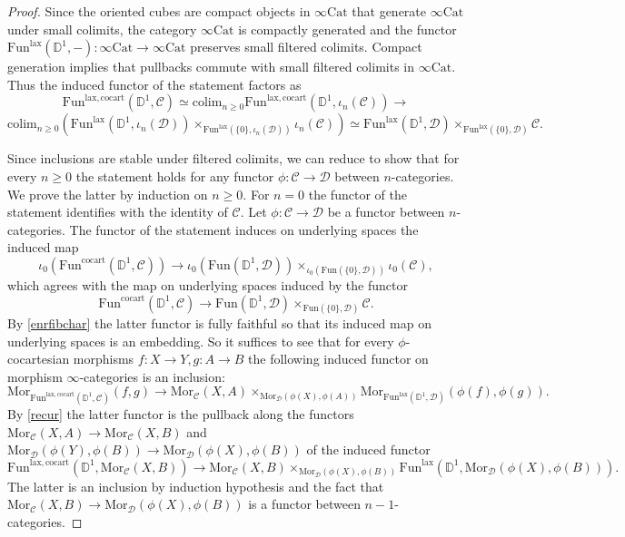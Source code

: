 \documentclass[10pt,oneside]{article}
\numberwithin{equation}{section} %
\numberwithin{figure}{section} %
\theoremstyle{plain}
\theoremstyle{definition}
\newcommand{\bD}{{\mathbb D}}
\newcommand{\mC}{{\mathcal C}}
\newcommand{\mD}{{\mathcal D}}
\newcommand{\colim}{\mathrm{colim}}
\newcommand{\Cat}{\mathrm{Cat}}
\newcommand{\Fun}{\mathrm{Fun}}
\newcommand{\cocart}{{\mathrm{cocart}}}
\newcommand{\lax}{{\mathrm{lax}}}
\newcommand{\Mor}{{\mathrm{Mor}}}
\begin{document}
\begin{proof}
Since the oriented cubes are compact objects in $\infty\Cat$ that generate $\infty\Cat$ under small colimits, the category $\infty\Cat$ is compactly generated and the functor
$\Fun^\lax(\bD^1,-): \infty\Cat \to \infty\Cat $ preserves small filtered colimits. Compact generation implies that pullbacks commute with small filtered colimits in $\infty\Cat$.
Thus the induced functor of the statement factors as $$\Fun^{\lax, \cocart}(\bD^1,\mC) \simeq \colim_{n\geq 0}\Fun^{\lax, \cocart}(\bD^1,\iota_n(\mC)) \to $$$$ \colim_{n\geq 0} (\Fun^\lax(\bD^1,\iota_n(\mD)) \times_{\Fun^\lax(\{0\},\iota_n(\mD))} \iota_n(\mC)) \simeq 
\Fun^\lax(\bD^1,\mD) \times_{\Fun^\lax(\{0\},\mD)} \mC.$$ 

Since inclusions are stable under filtered colimits, 
we can reduce to show that for every $n \geq 0$
the statement holds for any functor $\phi: \mC \to \mD$ between
$n$-categories. We prove the latter by induction on $n \geq 0.$
For $n =0$ the functor of the statement identifies with the identity of $\mC.$ 
Let $\phi: \mC \to \mD$ be a functor between $n$-categories.
The functor of the statement induces on underlying spaces the induced map
$$\iota_0(\Fun^{\cocart}(\bD^1,\mC)) \to \iota_0(\Fun(\bD^1,\mD)) \times_{\iota_0(\Fun(\{0\},\mD))} \iota_0(\mC),$$
which agrees with the map on underlying spaces induced by the functor
$$\Fun^{\cocart}(\bD^1,\mC) \to \Fun(\bD^1,\mD) \times_{\Fun(\{0\},\mD)} \mC.$$
By \cref{enrfibchar} the latter functor is fully faithful
so that its induced map on underlying spaces is an embedding.
So it suffices to see that for every $\phi$-cocartesian morphisms 
$f: X \to Y, g: A \to B$ the following induced functor on morphism $\infty$-categories is an inclusion:
$$\Mor_{\Fun^{\lax, \cocart}(\bD^1,\mC)}(f,g) \to \Mor_\mC(X,A) \times_{\Mor_\mD(\phi(X),\phi(A))} \Mor_{\Fun^\lax(\bD^1,\mD)}(\phi(f), \phi(g)).$$
By \cref{recur} the latter functor is the pullback along the functors
$ \Mor_\mC(X,A) \to \Mor_\mC(X,B) $ and
$\Mor_\mD(\phi(Y),\phi(B)) \to \Mor_\mD(\phi(X),\phi(B)) $ of the induced functor
$$ \Fun^{\lax, \cocart}(\bD^1,\Mor_\mC(X,B)) \to \Mor_\mC(X,B ) \times_{\Mor_\mD(\phi(X),\phi(B))} \Fun^\lax(\bD^1,\Mor_\mD(\phi(X),\phi(B))).$$
The latter is an inclusion by induction hypothesis and the fact that
$\Mor_\mC(X,B) \to \Mor_\mD(\phi(X),\phi(B))$ is a functor between $n-1$-categories.
\end{proof}
\end{document}
